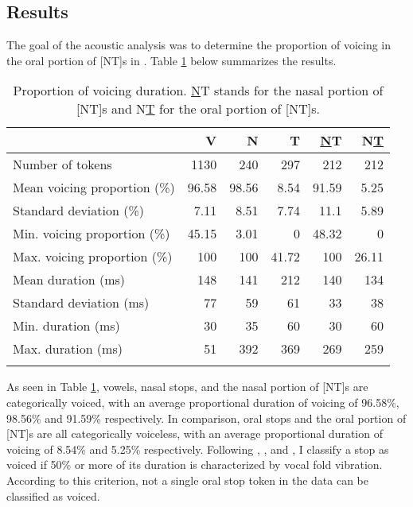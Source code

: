 \documentclass[output=paper,hidelinks]{langscibook}
\begin{document}
\subsection{Results}\largerpage

The goal of the acoustic analysis was to determine the proportion of voicing in the oral portion of [NT]s in . Table \ref{resultstable} below summarizes the results.

\begin{table}
\caption{Proportion of voicing duration. \underline{N}T stands for the nasal portion of [NT]s and N\underline{T} for the oral portion of [NT]s.}
\label{resultstable}
\begin{tabular}{l rrrrr}
\lsptoprule
                              & {V} & {N} & {T} & {\uline{N}T} & {N\uline{T}} \\ 
\midrule
Number of tokens              & {1130}       & {240}        & {297}        & {212}           & {212}           \\
Mean voicing proportion (\%)   & 96.58    & 98.56    & 8.54     & 91.59       & 5.25        \\
Standard deviation      (\%)      & 7.11     & 8.51     & 7.74     & 11.1        & 5.89        \\
Min. voicing proportion (\%) & 45.15    & 3.01     & 0        & 48.32       & 0           \\
Max. voicing proportion (\%) & 100      & 100      & 41.72    & 100         & 26.11       \\
\midrule
Mean duration (ms)               & 148      & 141      & 212      & 140         & 134         \\
Standard deviation (ms)            & 77       & 59       & 61       & 33          & 38          \\
Min. duration (ms)            & 30       & 35       & 60       & 30          & 60          \\
Max. duration (ms)            & 51       & 392      & 369      & 269         & 259        \\
\lspbottomrule
\end{tabular}
\end{table}

As seen in Table \ref{resultstable}, vowels, nasal stops, and the nasal portion of [NT]s are categorically voiced, with an average proportional duration of voicing of 96.58\%, 98.56\% and 91.59\% respectively. In comparison, oral stops and the oral portion of [NT]s are all categorically voiceless, with an average proportional duration of voicing of 8.54\% and 5.25\% respectively. Following \citet{WestburyKeating1986}, \citet{Hayes1999}, and \citet{Coetzee2007}, I classify a stop as voiced if 50\% or more of its duration is characterized by vocal fold vibration. According to this criterion, not a single oral stop token in the  data can be classified as voiced.
\end{document}
